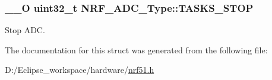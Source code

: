\subsubsection[{T\+A\+S\+K\+S\+\_\+\+S\+T\+O\+P}]{\setlength{\rightskip}{0pt plus 5cm}\+\_\+\+\_\+\+O uint32\+\_\+t N\+R\+F\+\_\+\+A\+D\+C\+\_\+\+Type\+::\+T\+A\+S\+K\+S\+\_\+\+S\+T\+O\+P}\label{struct_n_r_f___a_d_c___type_ab26ea43addd8c5ee09f04982593a5df7}
Stop A\+D\+C. 

The documentation for this struct was generated from the following file\+:\begin{DoxyCompactItemize}
\item 
D\+:/\+Eclipse\+\_\+workspace/hardware/\hyperlink{nrf51_8h}{nrf51.\+h}\end{DoxyCompactItemize}
